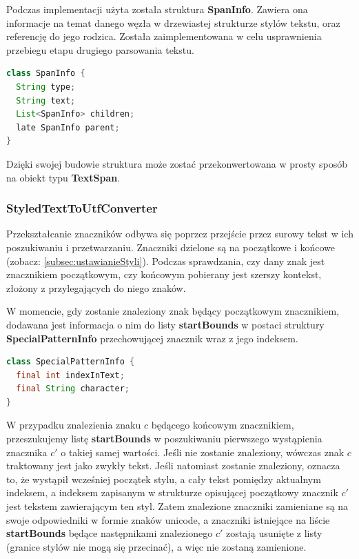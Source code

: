 Podczas implementacji użyta została struktura \textbf{SpanInfo}. Zawiera ona informacje na temat danego węzła w drzewiastej strukturze stylów tekstu, oraz referencję do jego rodzica.
Została zaimplementowana w celu usprawnienia przebiegu etapu drugiego parsowania tekstu.

\begin{lstlisting}[language=java]
class SpanInfo {
  String type;
  String text;
  List<SpanInfo> children;
  late SpanInfo parent;
}
\end{lstlisting}

Dzięki swojej budowie struktura może zostać przekonwertowana w prosty sposób na obiekt typu \textbf{TextSpan}.

\subsubsection{StyledTextToUtfConverter}

Przekształcanie znaczników odbywa się poprzez przejście przez surowy tekst w ich poszukiwaniu i przetwarzaniu. Znaczniki dzielone są na początkowe i końcowe (zobacz: \ref{subsec:ustawianieStyli}). Podczas sprawdzania, czy dany znak jest znacznikiem początkowym, czy końcowym pobierany jest szerszy kontekst, złożony z przylegających do niego znaków.

W momencie, gdy zostanie znaleziony znak będący początkowym znacznikiem, dodawana jest informacja o nim do listy \textbf{startBounds} w postaci struktury \textbf{SpecialPatternInfo} przechowującej znacznik wraz z jego indeksem.

\begin{lstlisting}[language=Java]
class SpecialPatternInfo {
  final int indexInText;
  final String character;
}
\end{lstlisting}

W przypadku znalezienia znaku $c$ będącego końcowym znacznikiem, przeszukujemy listę \textbf{startBounds} w poszukiwaniu pierwszego wystąpienia znacznika $c'$ o takiej samej wartości. Jeśli nie zostanie znaleziony, wówczas znak $c$ traktowany jest jako zwykły tekst. Jeśli natomiast zostanie znaleziony, oznacza to, że wystąpił wcześniej początek stylu, a cały tekst pomiędzy aktualnym indeksem, a indeksem zapisanym w strukturze opisującej początkowy znacznik $c'$ jest tekstem zawierającym ten styl. Zatem znalezione znaczniki zamieniane są na swoje odpowiedniki w formie znaków unicode, a znaczniki istniejące na liście \textbf{startBounds} będące następnikami znalezionego $c'$ zostają usunięte z listy (granice stylów nie mogą się przecinać), a więc nie zostaną zamienione.

